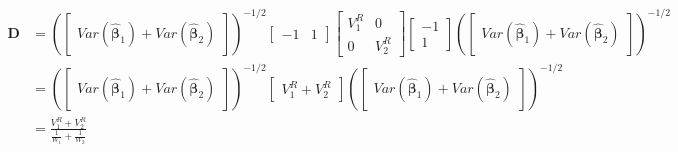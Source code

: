  \begin{equation}
    \begin{split}
       \mathbf{D} &=\left(\begin{bmatrix}
        Var(\bm{\hat{\beta}}_1) + Var(\bm{\hat{\beta}}_2) 
    \end{bmatrix} \right)^{-1/2} 
      \begin{bmatrix} 
     -1 & 1 
     \end{bmatrix} \begin{bmatrix}
         V^R_1 & 0 \\
         0& V^R_2 
     \end{bmatrix}
     \begin{bmatrix} 
     -1 \\
     1 
     \end{bmatrix} 
     \left(\begin{bmatrix}
        Var(\bm{\hat{\beta}}_1) + Var(\bm{\hat{\beta}}_2 )
    \end{bmatrix} \right)^{-1/2} \\
    &=\left(\begin{bmatrix}
        Var(\bm{\hat{\beta}}_1) + Var(\bm{\hat{\beta}}_2) 
    \end{bmatrix} \right)^{-1/2} 
       \begin{bmatrix}
        V^R_1 + V^R_2 
    \end{bmatrix}
     \left(\begin{bmatrix}
        Var(\bm{\hat{\beta}}_1) + Var(\bm{\hat{\beta}}_2) 
    \end{bmatrix} \right)^{-1/2} \\
    & = \frac{V^R_1 + V^R_2 }{\frac{1}{W_1} + \frac{1}{W_2} }
    \end{split} 
    \nonumber
 \end{equation}

